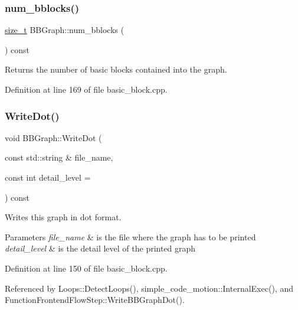 \subsubsection{\texorpdfstring{num\+\_\+bblocks()}{num\_bblocks()}}
{\footnotesize\ttfamily \hyperlink{tutorial__fpt__2017_2intro_2sixth_2test_8c_a7c94ea6f8948649f8d181ae55911eeaf}{size\+\_\+t} B\+B\+Graph\+::num\+\_\+bblocks (\begin{DoxyParamCaption}{ }\end{DoxyParamCaption}) const}



Returns the number of basic blocks contained into the graph. 



Definition at line 169 of file basic\+\_\+block.\+cpp.

\mbox{\label{structBBGraph_a4f364a493a1d4c43bdee96970d545bf0}} 
\subsubsection{\texorpdfstring{Write\+Dot()}{WriteDot()}\hspace{0.1cm}{\footnotesize\ttfamily [1/2]}}
{\footnotesize\ttfamily void B\+B\+Graph\+::\+Write\+Dot (\begin{DoxyParamCaption}\item[{const std\+::string \&}]{file\+\_\+name,  }\item[{const int}]{detail\+\_\+level = {} }\end{DoxyParamCaption}) const}



Writes this graph in dot format. 


\begin{DoxyParams}{Parameters}
{\em file\+\_\+name} & is the file where the graph has to be printed \\
\hline
{\em detail\+\_\+level} & is the detail level of the printed graph \\
\hline
\end{DoxyParams}


Definition at line 150 of file basic\+\_\+block.\+cpp.



Referenced by Loops\+::\+Detect\+Loops(), simple\+\_\+code\+\_\+motion\+::\+Internal\+Exec(), and Function\+Frontend\+Flow\+Step\+::\+Write\+B\+B\+Graph\+Dot().

